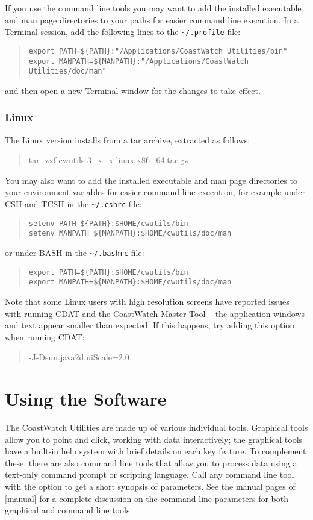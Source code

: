 If you use the command line tools you may want to add the installed
executable and man page directories to your paths for easier command line execution.
In a Terminal session, add the following lines to the {\tt \~{ }/.profile}
file:
\begin{quote}
  {\tt export PATH=\$\{PATH\}:"/Applications/CoastWatch Utilities/bin"} \\
  {\tt export MANPATH=\$\{MANPATH\}:"/Applications/CoastWatch Utilities/doc/man"}
\end{quote}
and then open a new Terminal window for the changes to take effect.

\subsubsection{Linux}

The Linux version installs from a tar archive, extracted as follows:
\begin{quote}
  {\file tar -zxf cwutils-3\_x\_x-linux-x86\_64.tar.gz}
\end{quote}
You may also want to add the installed executable and man page directories to
your environment variables for easier command line
execution, for example under CSH and TCSH in the {\tt \~{ }/.cshrc} file:
\begin{quote}
  {\tt setenv PATH \$\{PATH\}:\$HOME/cwutils/bin} \\
  {\tt setenv MANPATH \$\{MANPATH\}:\$HOME/cwutils/doc/man}
\end{quote}
or under BASH in the {\tt \~{ }/.bashrc} file:
\begin{quote}
  {\tt export PATH=\$\{PATH\}:\$HOME/cwutils/bin} \\
  {\tt export MANPATH=\$\{MANPATH\}:\$HOME/cwutils/doc/man}
\end{quote}
Note that some Linux users with high resolution screens have reported issues with 
running CDAT and the CoastWatch Master Tool -- the application windows 
and text appear smaller than expected.  If this happens, try adding this option
when running CDAT:
\begin{quote}
  -J-Dsun.java2d.uiScale=2.0
\end{quote}

\section{Using the Software}

The CoastWatch Utilities are made up of various individual tools.
Graphical tools allow you to point and click, working with data
interactively; the graphical tools have a built-in help system
with brief details on each key feature.  To complement these,
there are also command line tools that allow you to process data
using a text-only command prompt or scripting language.  Call any
command line tool with the  option to get a
short synopsis of parameters.  See the manual pages of
\autoref{manual} for a complete discussion on the command line
parameters for both graphical and command line tools.

